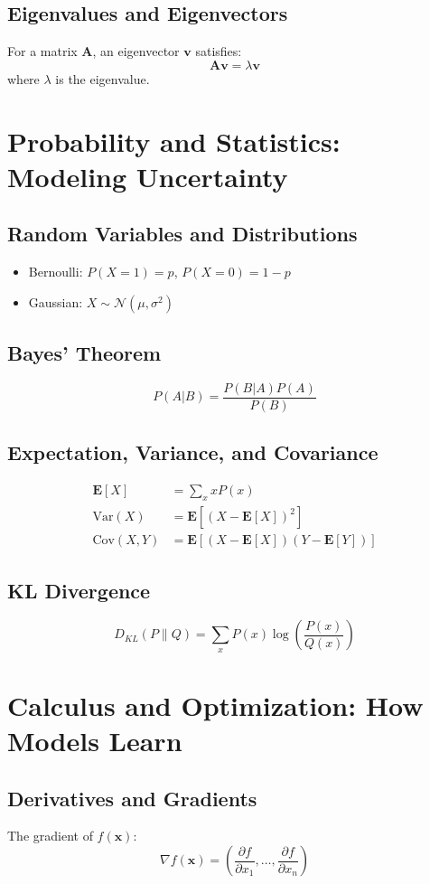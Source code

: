 \documentclass[openany]{book}
\begin{document}
\subsection{Eigenvalues and Eigenvectors}
For a matrix $\mathbf{A}$, an eigenvector $\mathbf{v}$ satisfies:
\[
\mathbf{Av} = \lambda\mathbf{v}
\]
where $\lambda$ is the eigenvalue.

\section{Probability and Statistics: Modeling Uncertainty}

\subsection{Random Variables and Distributions}
\begin{itemize}
    \item Bernoulli: $P(X=1) = p$, $P(X=0) = 1-p$
    \item Gaussian: $X \sim \mathcal{N}(\mu, \sigma^2)$
\end{itemize}

\subsection{Bayes' Theorem}
\[
P(A|B) = \frac{P(B|A)P(A)}{P(B)}
\]

\subsection{Expectation, Variance, and Covariance}
\begin{align*}
\mathbf{E}[X] &= \sum_x xP(x) \\
\text{Var}(X) &= \mathbf{E}[(X-\mathbf{E}[X])^2] \\
\text{Cov}(X,Y) &= \mathbf{E}[(X-\mathbf{E}[X])(Y-\mathbf{E}[Y])]
\end{align*}

\subsection{KL Divergence}
\[
D_{KL}(P \| Q) = \sum_x P(x)\log\left(\frac{P(x)}{Q(x)}\right)
\]

\section{Calculus and Optimization: How Models Learn}

\subsection{Derivatives and Gradients}
The gradient of $f(\mathbf{x})$:
\[
\nabla f(\mathbf{x}) = \left(\frac{\partial f}{\partial x_1}, \ldots, 
\frac{\partial f}{\partial x_n}\right)
\]
\end{document}
